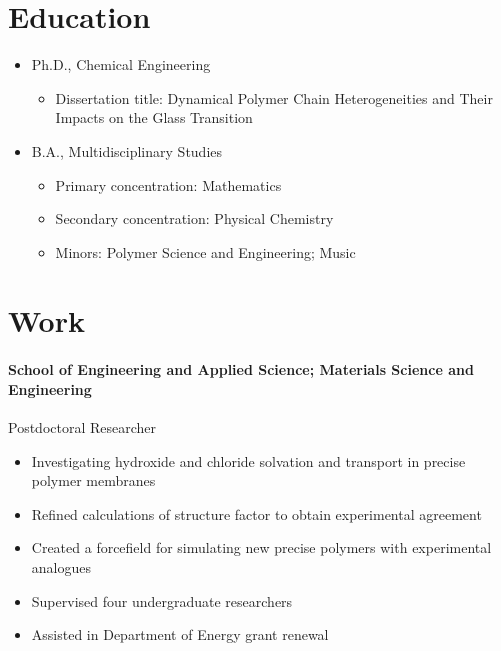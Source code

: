 \documentclass{my_cv}
\begin{document}

\section{Education}
\begin{itemize}
    \item Ph.D., Chemical Engineering
    \begin{itemize}
        \item Dissertation title: Dynamical Polymer Chain Hetero\-ge\-ne\-i\-ties and Their Impacts on the Glass Transition
    \end{itemize}
\end{itemize}
\begin{itemize}
    \item B.A., Multidisciplinary Studies
    \begin{itemize}
        \item Primary concentration: Mathematics
        \item Secondary concentration: Physical Chemistry
    \item Minors: Polymer Science and Engineering; Music
    \end{itemize}
\end{itemize}

\section{Work}
\paragraph{School of Engineering and Applied Science; Materials Science and Engineering\\}
Post\-doctoral Researcher
\begin{itemize}
    \item Investigating hydroxide and chloride solvation and transport in precise polymer membranes
    \item Refined calculations of structure factor to obtain experimental agreement
    \item Created a force\-field for simulating new precise polymers with experimental analogues
    \item Supervised four undergraduate researchers
    \item Assisted in Department of Energy grant renewal
\end{itemize}
\end{document}

